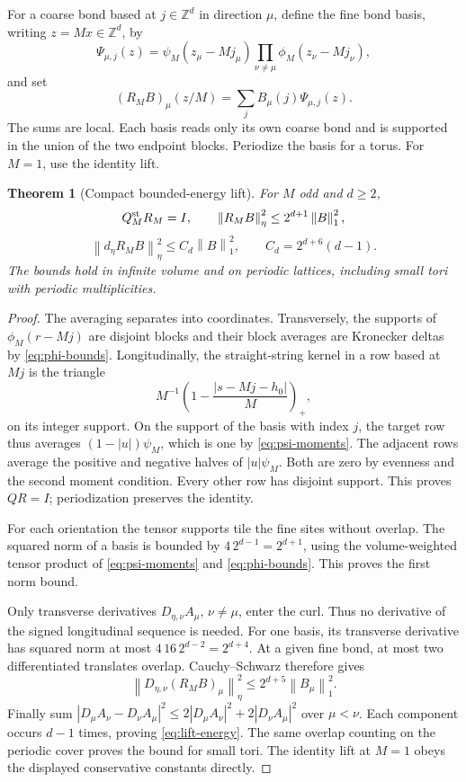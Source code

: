 \documentclass[11pt]{article}
\newtheorem{theorem}{Theorem}[section]
\theoremstyle{remark}
\newcommand{\norm}[1]{\left\|#1\right\|}
\begin{document}
For a coarse bond based at $j\in\mathbb Z^d$ in direction $\mu$,
define the fine bond basis, writing $z=Mx\in\mathbb Z^d$, by
\[
 \Psi_{\mu,j}(z)=\psi_M(z_\mu-Mj_\mu)
                \prod_{\nu\ne\mu}\phi_M(z_\nu-Mj_\nu),
\]
and set
\begin{equation}\label{eq:lift}
 (R_MB)_\mu(z/M)=\sum_jB_\mu(j)\Psi_{\mu,j}(z).
\end{equation}
The sums are local. Each basis reads only its own coarse bond and
is supported in the union of the two endpoint blocks. Periodize the
basis for a torus. For $M=1$, use the identity lift.

\begin{theorem}[Compact bounded-energy lift]\label{thm:lift}
For $M$ odd and $d\ge2$,
\begin{equation}\label{eq:lift-bounds}
 Q_M^{\rm st}R_M=I,\qquad
 \norm{R_MB}_\eta^2\le2^{d+1}\norm B_1^2,
\end{equation}
\begin{equation}\label{eq:lift-energy}
 \norm{d_\eta R_MB}_\eta^2
 \le C_d\norm B_1^2,
 \qquad C_d=2^{d+6}(d-1).
\end{equation}
The bounds hold in infinite volume and on periodic lattices, including
small tori with periodic multiplicities.
\end{theorem}

\begin{proof}
The averaging separates into coordinates. Transversely, the supports
of $\phi_M(r-Mj)$ are disjoint blocks and their block averages are
Kronecker deltas by \eqref{eq:phi-bounds}.
Longitudinally, the straight-string kernel in a row based at $Mj$
is the triangle
\[
 M^{-1}\left(1-\frac{|s-Mj-h_0|}{M}\right)_+,
\]
on its integer support. On the support of the basis with index $j$,
the target row thus averages $(1-|u|)\psi_M$, which is one by
\eqref{eq:psi-moments}. The adjacent rows average the positive and
negative halves of $|u|\psi_M$. Both are zero by evenness and the
second moment condition. Every other row has disjoint support.
This proves $QR=I$; periodization preserves the identity.

For each orientation the tensor supports tile the fine sites without
overlap. The squared norm of a basis is bounded by
$4\,2^{d-1}=2^{d+1}$, using the volume-weighted tensor product
of \eqref{eq:psi-moments} and \eqref{eq:phi-bounds}.
This proves the first norm bound.

Only transverse derivatives $D_{\eta,\nu}A_\mu$, $\nu\ne\mu$,
enter the curl. Thus no derivative of the signed longitudinal
sequence is needed. For one basis, its transverse derivative has
squared norm at most $4\,16\,2^{d-2}=2^{d+4}$.
At a given fine bond, at most two differentiated translates overlap.
Cauchy--Schwarz therefore gives
\[
 \norm{D_{\eta,\nu}(R_MB)_\mu}_\eta^2
 \le2^{d+5}\norm{B_\mu}_1^2.
\]
Finally sum
$|D_\mu A_\nu-D_\nu A_\mu|^2\le
2|D_\mu A_\nu|^2+2|D_\nu A_\mu|^2$
over $\mu<\nu$. Each component occurs $d-1$ times, proving
\eqref{eq:lift-energy}. The same overlap counting on the periodic
cover proves the bound for small tori. The identity lift at $M=1$
obeys the displayed conservative constants directly.
\end{proof}
\end{document}
